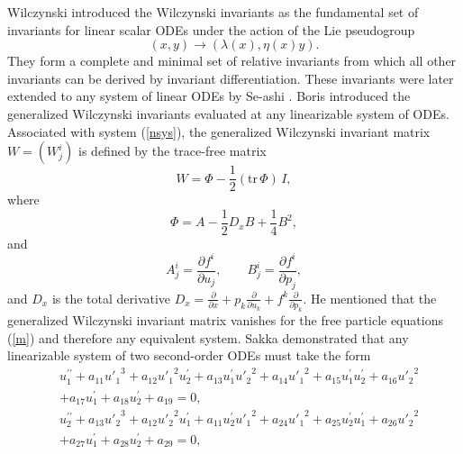 \documentclass[12pt]{article}
\begin{document}
Wilczynski \cite{26} introduced the Wilczynski invariants as the fundamental set of invariants for linear scalar ODEs under the action of the Lie pseudogroup
\begin{equation}
(x,y)\rightarrow(\lambda(x),\eta(x)y).
\end{equation} They form a complete and minimal set of relative invariants from which all other invariants can be derived by invariant differentiation.
These invariants were later extended to any system of linear ODEs by Se-ashi \cite{20}.
Boris \cite{21} introduced the generalized Wilczynski invariants evaluated at any linearizable system of ODEs. Associated with system (\ref{nsys}), the generalized Wilczynski invariant matrix $W=(W^i_j)$ is defined by the trace-free matrix
\begin{equation}
W
=
\Phi - \frac{1}{2}(\mathrm{tr}\,\Phi)\,I,
\end{equation}
where  
\begin{equation}
\Phi = A - \frac{1}{2}D_x B +\frac{1}{4}B^2,
\end{equation}
and
\begin{equation}
A^i_j = \frac{\partial f^i}{\partial u_j}, 
\qquad 
B^i_j = \frac{\partial f^i}{\partial p_j},
\end{equation}
and $D_x$ is the total derivative $D_x = \frac{\partial}{\partial x}
+ p_k\frac{\partial}{\partial u_k}
+ f^k\frac{\partial}{\partial p_k}.$ He mentioned that the generalized Wilczynski invariant matrix vanishes for the free particle equations (\ref{m}) and therefore any equivalent system.
Sakka \cite{p18} demonstrated that any linearizable system of two second-order ODEs must take the form
 \begin{equation}\label{cubic}
\begin{aligned}
& u_{1}^{\prime\prime}+a_{11}{u'_1}^{3}+a_{12}{u'_1}^{2}u^{\prime}_{2}+a_{13}u^{\prime}_{1}{u'_2}^{2}+a_{14}{u'_1}^{2}+a_{15}u^{\prime}_{1}u^{\prime}_{2}+a_{16}{u'_2}^{2}\\
&+a_{17}u^{\prime}_{1}+a_{18}u^{\prime}_{2}+a_{19}=0,\\
&u_{2}^{\prime\prime}+a_{13}{u'_2}^{3}+a_{12}{u'_2}^{2}u^{\prime}_{1}+a_{11}u^{\prime}_{2}{u'_1}^{2}+a_{24}{u'_1}^{2}+a_{25}u^{\prime}_{2}u^{\prime}_{1}+a_{26}{u'_2}^{2}\\
&+a_{27}u^{\prime}_{1}+a_{28}u^{\prime}_{2}+a_{29}=0,\\
\end{aligned}
\end{equation} 
\end{document}

